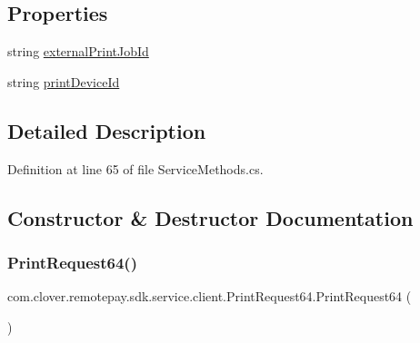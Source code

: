 \subsection*{Properties}
\begin{DoxyCompactItemize}
\item 
string \hyperlink{classcom_1_1clover_1_1remotepay_1_1sdk_1_1service_1_1client_1_1_print_request64_ac51068d262d0241252c6928b9ae4daa3}{external\+Print\+Job\+Id}
\item 
string \hyperlink{classcom_1_1clover_1_1remotepay_1_1sdk_1_1service_1_1client_1_1_print_request64_a1f68662859da11bcf6f3e982750dd0d6}{print\+Device\+Id}
\end{DoxyCompactItemize}


\subsection{Detailed Description}


Definition at line 65 of file Service\+Methods.\+cs.



\subsection{Constructor \& Destructor Documentation}
\mbox{\label{classcom_1_1clover_1_1remotepay_1_1sdk_1_1service_1_1client_1_1_print_request64_a1ee835745ac63886a435e6251f254d6b}} 
\subsubsection{\texorpdfstring{Print\+Request64()}{PrintRequest64()}}
{\footnotesize\ttfamily com.\+clover.\+remotepay.\+sdk.\+service.\+client.\+Print\+Request64.\+Print\+Request64 (\begin{DoxyParamCaption}{ }\end{DoxyParamCaption})}



